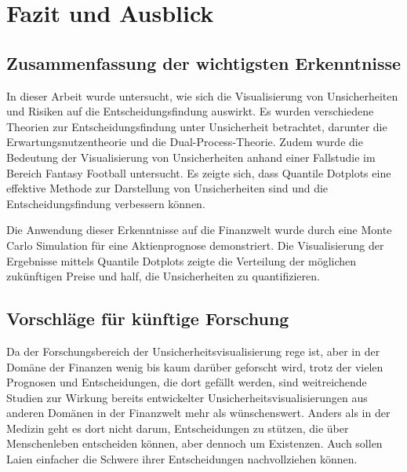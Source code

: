 \section{Fazit und Ausblick}

\subsection{Zusammenfassung der wichtigsten Erkenntnisse}

In dieser Arbeit wurde untersucht, wie sich die Visualisierung von Unsicherheiten und Risiken auf die Entscheidungsfindung auswirkt. Es wurden verschiedene Theorien zur Entscheidungsfindung unter Unsicherheit betrachtet, darunter die Erwartungsnutzentheorie und die Dual-Process-Theorie. Zudem wurde die Bedeutung der Visualisierung von Unsicherheiten anhand einer Fallstudie im Bereich Fantasy Football untersucht. Es zeigte sich, dass Quantile Dotplots eine effektive Methode zur Darstellung von Unsicherheiten sind und die Entscheidungsfindung verbessern können.

Die Anwendung dieser Erkenntnisse auf die Finanzwelt wurde durch eine Monte Carlo Simulation für eine Aktienprognose demonstriert. Die Visualisierung der Ergebnisse mittels Quantile Dotplots zeigte die Verteilung der möglichen zukünftigen Preise und half, die Unsicherheiten zu quantifizieren.

\subsection{Vorschläge für künftige Forschung}

Da der Forschungsbereich der Unsicherheitsvisualisierung rege ist, aber in der Domäne der Finanzen wenig bis kaum darüber geforscht wird, trotz der vielen Prognosen und Entscheidungen, die dort gefällt werden, sind weitreichende Studien zur Wirkung bereits entwickelter Unsicherheitsvisualisierungen aus anderen Domänen in der Finanzwelt mehr als wünschenswert. Anders als in der Medizin geht es dort nicht darum, Entscheidungen zu stützen, die über Menschenleben entscheiden können, aber dennoch um Existenzen. Auch sollen Laien einfacher die Schwere ihrer Entscheidungen nachvollziehen können.
